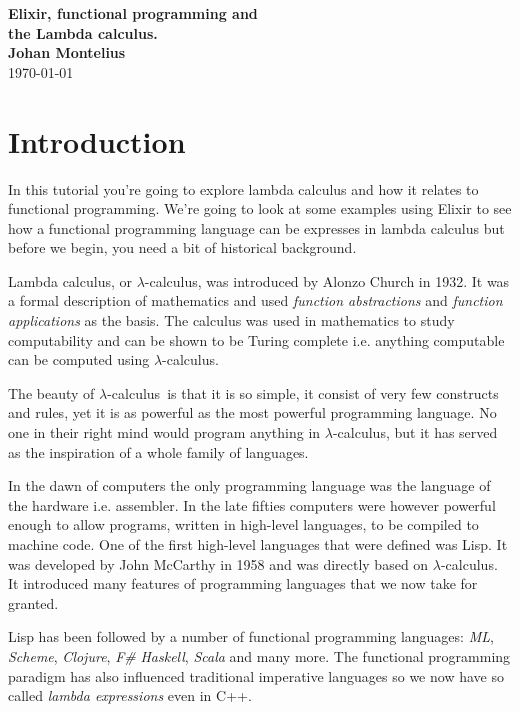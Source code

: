 \documentclass[a4paper,11pt]{article}
\newcommand{\nnsection}[1]{
\section*{#1}
\addcontentsline{toc}{section}{#1}
}
\begin{document}
\begin{center}
\vspace{20pt}
\textbf{\large Elixir, functional programming and\\ the Lambda calculus.}\\
\vspace{10pt}
\textbf{Johan Montelius}\\
\vspace{10pt}
\today{}
\end{center}

\newcommand{\lamc}[0]{$\lambda$-calculus}
\newcommand{\lama}[0]{$\lambda$-abstraction}
\newcommand{\lame}[0]{$\lambda$-expression}
\newcommand{\alphac}[0]{$\alpha$-conversion}
\newcommand{\betar}[0]{$\beta$-reduction}
\newcommand{\etac}[0]{$\eta$-conversion}

\nnsection{Introduction}

In this tutorial you're going to explore lambda calculus and how it
relates to functional programming. We're going to look at some
examples using Elixir to see how a functional programming language can
be expresses in lambda calculus but before we begin, you need a bit of
historical background.

Lambda calculus, or \lamc, was introduced by Alonzo Church in 1932. It
was a formal description of mathematics and used {\em function abstractions}
and {\em function applications} as the basis. The calculus was used in
mathematics to study computability and can be shown to be Turing
complete i.e. anything computable can be computed using \lamc.


The beauty of \lamc\ is that it is so simple, it consist of very few
constructs and rules, yet it is as powerful as the most powerful
programming language. No one in their right mind would program
anything in \lamc, but it has served as the inspiration of a whole
family of languages.

In the dawn of computers the only programming language was the language of
the hardware i.e. assembler. In the late fifties computers were
however powerful enough to allow programs, written in high-level
languages, to be compiled to machine code. One of the first high-level
languages that were defined was Lisp. It was developed by John
McCarthy in 1958 and was directly based on \lamc. It introduced many
features of programming languages that we now take for granted.

Lisp has been followed by a number of functional
programming languages: {\em ML}, {\em Scheme}, {\em Clojure}, {\em
  F\#} {\em Haskell}, {\em Scala} and many more. The functional
programming paradigm has also influenced traditional imperative
languages so we now have so called {\em lambda expressions} even in C++.
\end{document}

